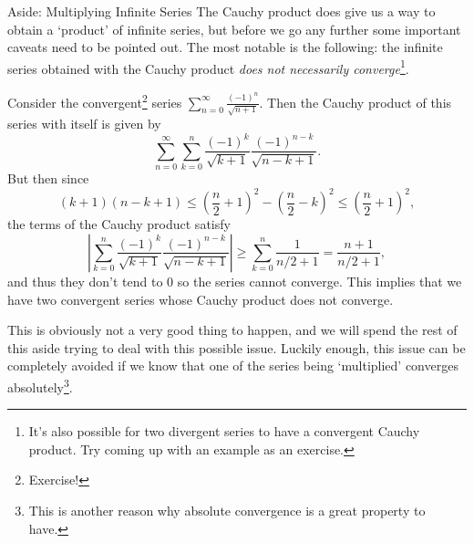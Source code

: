 \documentclass[a4paper]{scrartcl}
\begin{document}
\begin{aside}{Aside: Multiplying Infinite Series}
The Cauchy product does give us a way to obtain a `product' of infinite series, but before we go any further some important caveats need to be pointed out. The most notable is the following: the infinite series obtained with the Cauchy product \emph{does not necessarily converge}\footnote{It's also possible for two divergent series to have a convergent Cauchy product. Try coming up with an example as an exercise.}.

\begin{example*}
	Consider the convergent\footnote{Exercise!} series $\sum_{n = 0}^{\infty} \frac{(-1)^n}{\sqrt{n + 1}}$. Then the Cauchy product of this series with itself is given by
	$$
	\sum_{n = 0}^{\infty} \sum_{k = 0}^n \frac{(-1)^k}{\sqrt{k + 1}} \frac{(-1)^{n - k}}{\sqrt{n - k + 1}}.
	$$
	But then since
	$$
	(k + 1)(n - k + 1) \leq \left(\frac{n}{2} + 1\right)^2 - \left(\frac{n}{2} - k\right)^2 \leq \left(\frac{n}{2} + 1\right)^2,
	$$
	the terms of the Cauchy product satisfy
	$$
	\left|\sum_{k = 0}^n \frac{(-1)^k}{\sqrt{k + 1}} \frac{(-1)^{n - k}}{\sqrt{n - k + 1}}\right| \geq \sum_{k = 0}^n \frac{1}{n/2 + 1} = \frac{n + 1}{n/2 + 1},
	$$
	and thus they don't tend to 0 so the series cannot converge. This implies that we have two convergent series whose Cauchy product does not converge.
\end{example*}

	

This is obviously not a very good thing to happen, and we will spend the rest of this aside trying to deal with this possible issue.
Luckily enough, this issue can be completely avoided if we know that one of the series being `multiplied' converges absolutely\footnote{This is another reason why absolute convergence is a great property to have.}.


\end{aside}
\end{document}
